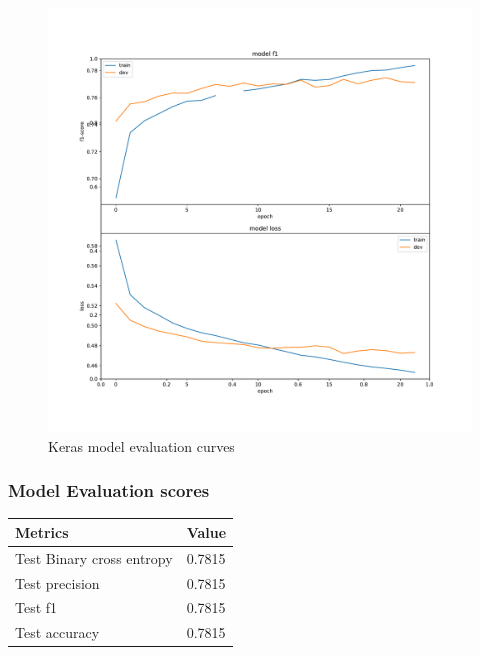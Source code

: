 \documentclass[10pt]{article}
\begin{document}
\begin{figure}[H]
\caption{Keras model evaluation curves}
\includegraphics[width=\textwidth]{History_keras.pdf}
\end{figure}

 \subsubsection*{Model Evaluation scores}

\begin{tabular}{ |p{5cm}||p{2cm}|  }
  \hline
 \textbf{Metrics} &  \textbf{Value}\\
 \hline
 Test Binary cross entropy & 0.7815 \\ \hline
 Test precision &0.7815 \\  \hline
 Test f1 & 0.7815 \\ \hline
 Test accuracy & 0.7815 \\
 \hline
 \hline
\end{tabular}

\bigskip
\end{document}
